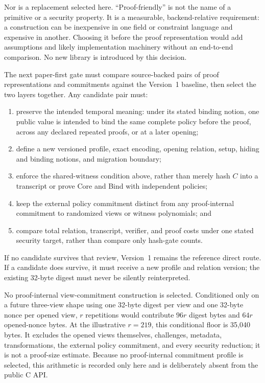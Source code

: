 Nor is a replacement selected here. ``Proof-friendly'' is not the name of a
primitive or a security property. It is a measurable, backend-relative
requirement: a construction can be inexpensive in one field or constraint
language and expensive in another. Choosing it before the proof
representation would add assumptions and likely implementation machinery
without an end-to-end comparison. No new library is introduced by this
decision.

The next paper-first gate must compare source-backed pairs of proof
representations and commitments against the Version~1 baseline, then select
the two layers together. Any candidate pair must:

\begin{enumerate}
    \item preserve the intended temporal meaning: under its stated binding
    notion, one public value is intended to bind the same complete policy
    before the proof, across any declared repeated proofs, or at a later
    opening;
    \item define a new versioned profile, exact encoding, opening relation,
    setup, hiding and binding notions, and migration boundary;
    \item enforce the shared-witness condition above, rather than merely hash
    $C$ into a transcript or prove Core and Bind with independent policies;
    \item keep the external policy commitment distinct from any
    proof-internal commitment to randomized views or witness polynomials; and
    \item compare total relation, transcript, verifier, and proof costs under
    one stated security target, rather than compare only hash-gate counts.
\end{enumerate}

If no candidate survives that review, Version~1 remains the reference direct
route. If a candidate does survive, it must receive a new profile and relation
version; the existing 32-byte digest must never be silently reinterpreted.

No proof-internal view-commitment construction is selected. Conditioned only
on a future three-view shape using one 32-byte digest per view and one 32-byte
nonce per opened view, \(r\) repetitions would contribute \(96r\) digest
bytes and \(64r\) opened-nonce bytes. At the illustrative \(r=219\), this
conditional floor is 35,040 bytes. It excludes the opened views themselves,
challenges, metadata, transformations, the external policy commitment, and
every security reduction; it is not a proof-size estimate.
Because no proof-internal commitment profile is selected, this arithmetic is
recorded only here and is deliberately absent from the public C API.

